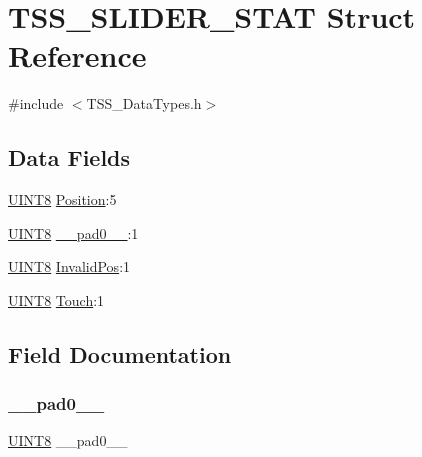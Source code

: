 \hypertarget{struct_t_s_s___s_l_i_d_e_r___s_t_a_t}{}\section{T\+S\+S\+\_\+\+S\+L\+I\+D\+E\+R\+\_\+\+S\+T\+AT Struct Reference}
\label{struct_t_s_s___s_l_i_d_e_r___s_t_a_t}


{\ttfamily \#include $<$T\+S\+S\+\_\+\+Data\+Types.\+h$>$}

\subsection*{Data Fields}
\begin{DoxyCompactItemize}
\item 
\hyperlink{_t_s_s___data_types_8h_ab27e9918b538ce9d8ca692479b375b6a}{U\+I\+N\+T8} \hyperlink{struct_t_s_s___s_l_i_d_e_r___s_t_a_t_a9153774cda24b9a14a047bf6dd6f9e33}{Position}\+:5
\item 
\hyperlink{_t_s_s___data_types_8h_ab27e9918b538ce9d8ca692479b375b6a}{U\+I\+N\+T8} \hyperlink{struct_t_s_s___s_l_i_d_e_r___s_t_a_t_a2ee36fe5d196fb00b71d0929ff19fe04}{\+\_\+\+\_\+pad0\+\_\+\+\_\+}\+:1
\item 
\hyperlink{_t_s_s___data_types_8h_ab27e9918b538ce9d8ca692479b375b6a}{U\+I\+N\+T8} \hyperlink{struct_t_s_s___s_l_i_d_e_r___s_t_a_t_aec6b9236894a06231c35520f44102548}{Invalid\+Pos}\+:1
\item 
\hyperlink{_t_s_s___data_types_8h_ab27e9918b538ce9d8ca692479b375b6a}{U\+I\+N\+T8} \hyperlink{struct_t_s_s___s_l_i_d_e_r___s_t_a_t_af14847cac91c6738b89713699d9b9c75}{Touch}\+:1
\end{DoxyCompactItemize}


\subsection{Field Documentation}
\mbox{\label{struct_t_s_s___s_l_i_d_e_r___s_t_a_t_a2ee36fe5d196fb00b71d0929ff19fe04}} 
\subsubsection{\texorpdfstring{\+\_\+\+\_\+pad0\+\_\+\+\_\+}{\_\_pad0\_\_}}
{\footnotesize\ttfamily \hyperlink{_t_s_s___data_types_8h_ab27e9918b538ce9d8ca692479b375b6a}{U\+I\+N\+T8} \+\_\+\+\_\+pad0\+\_\+\+\_\+}

